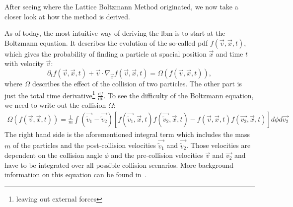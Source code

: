 After seeing where the Lattice Boltzmann Method originated, we now take a closer look at how the method is derived.

As of today, the most intuitive way of deriving the \gls{lbm} is to start at the Boltzmann equation.
It describes the evolution of the so-called \gls{pdf} $f(\vec{v},\vec{x},t)$, which gives the probability of finding a particle at spacial position $\vec{x}$ and time $t$ with velocity $\vec{v}$:
\begin{equation}
  \label{eq: Boltzmann transport equation}
  \partial_t f(\vec{v},\vec{x},t) + \vec{v} \cdot \nabla_{\vec{x}} f(\vec{v},\vec{x},t) = \Omega\left(f(\vec{v},\vec{x},t)\right),
\end{equation}
where $\Omega$ describes the effect of the collision of two particles. The other part is just the total time derivative\footnote{leaving out external forces} $\frac{\text{d}f}{\text{d}t}$.
To see the difficulty of the Boltzmann equation, we need to write out the collision $\Omega$:
\begin{equation}
  \label{eq: Collision of boltzmann equation}
  \begin{aligned}
 \Omega\left(f(\vec{v},\vec{x},t)\right) =\frac{1}{m}
  \int \left( \vec{\tilde{v}_1}-\vec{\tilde{v}_2}\right)
  \left[
    f(\vec{\tilde{v}_1},\vec{x},t)f(\vec{\tilde{v}_2},\vec{x},t)
    -f(\vec{v},\vec{x},t)f(\vec{v_2},\vec{x},t)
  \right] d\phi d\vec{v_2}
\end{aligned}
\end{equation}
The right hand side is the aforementioned integral term which includes the mass $m$ of the particles and the post-collision velocities $\vec{\tilde{v}_1}$ and $\vec{\tilde{v}_2}$.
Those velocities are dependent on the collision angle $\phi$ and the pre-collision velocities $\vec{v}$ and $\vec{v_2}$ and have to be integrated over all possible collision scenarios.
More background information on this equation can be found in~\cite{harris2004introduction}.

